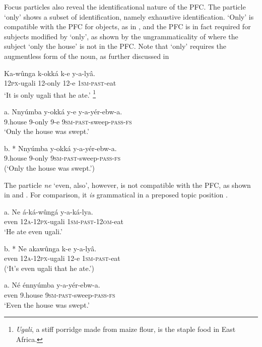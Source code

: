 \documentclass[output=paper]{langsci/langscibook}
\begin{document}
Focus particles also reveal the identificational nature of the PFC. The particle ‘only’ shows a subset of identification, namely exhaustive identification. ‘Only’ is compatible with the PFC for objects, as in , and the PFC is in fact required for subjects modified by ‘only’, as shown by the ungrammaticality of  where the subject ‘only the house’ is not in the PFC. Note that ‘only’ requires the augmentless form of the noun, as further discussed in 

\ea
\gll   Ka-wûnga  k-okká    k-e  y-a-lyâ.{} \\
       \textsc{12px}-ugali  12-only  12-e  \textsc{1sm}-\textsc{past}-eat\\
\glt   ‘It is only ugali that he ate.’{} \footnote{\textit{Ugali}, a stiff porridge made from maize flour, is the staple food in East Africa.}
\z

\ea
\gll   a.  Nnyúmba  y-okká  y-e  y-a-yér-ebw-a.\\
         9.house  9-only  9-e  \textsc{9sm}-\textsc{past}-sweep-\textsc{pass}-\textsc{fs}\\
\glt     ‘Only the house was swept.’
\z

\ea
\gll   b.  * Nnyúmba  y-okká    y-a-yér-ebw-a.\\
         9.house  9-only    \textsc{9sm}-\textsc{past}-sweep-\textsc{pass}-\textsc{fs}\\
\glt     (‘Only the house was swept.’)
\z

The particle \textit{ne} ‘even, also’, however, is not compatible with the PFC, as shown in  and . For comparison, it \textit{is} grammatical in a preposed topic position .

\ea
\gll   a.  Ne  á-ká-wûngá    y-a-ká-lya.\\
         even  \textsc{12a}-\textsc{12px}-ugali  \textsc{1sm}-\textsc{past}-\textsc{12om}-eat\\
\glt     ‘He ate even ugali.’
\z

\ea
\gll   b.  * Ne  akawûnga    k-e  y-a-lyâ.\\
         even  \textsc{12a}-\textsc{12px}-ugali  12-e  \textsc{1sm}-\textsc{past}-eat\\
\glt     (‘It’s even ugali that he ate.’)
\z

\ea
\gll   a.  Né  énnyúmba  y-a-yér-ebw-a.\\
         even  9.house  \textsc{9sm}-\textsc{past}-sweep-\textsc{pass}-\textsc{fs}\\
\glt     ‘Even the house was swept.’
\z
\end{document}
